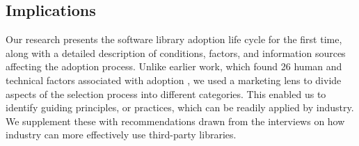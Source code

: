 \subsection{Implications} 

Our research presents the software library adoption life cycle for the first time, along with a detailed description of conditions, factors, and information sources affecting the adoption process. Unlike earlier work, which found 26 human and technical factors associated with adoption \cite{larios2020selecting}, we used a marketing lens to divide aspects of the selection process into different categories. This enabled us to identify guiding principles, or practices, which can be readily applied by industry. We supplement these with recommendations drawn from the interviews on how industry can more effectively use third-party libraries. 


